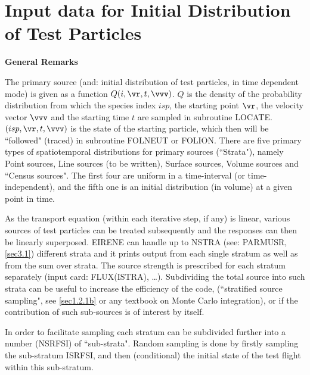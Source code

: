 \section{Input data for Initial Distribution of Test Particles}
\label{sec2.7}

\textbf{General Remarks} 

\medskip 

The primary source (and: initial distribution of test particles, in time
dependent mode) is given as a function $Q(i, \vr,t , \vvv)$.
$ Q $ is the density of the probability distribution from which the species
index $ isp $, the starting point $\vr $, the velocity vector $\vvv $ and the
starting time $ t $ are sampled in subroutine LOCATE.
$(isp, \vr,t, \vvv)$ is the state of the starting particle, which then will be
``followed" (traced) in subroutine FOLNEUT or FOLION.
There are five primary types of spatiotemporal distributions for primary
sources (``Strata"), namely Point sources, Line sources (to be written),
Surface sources, Volume sources and ``Census sources".
The first four are uniform in a time-interval (or time-independent), and the
fifth one is an initial distribution (in volume) at a given point in time.

As the transport equation (within each iterative step, if any) is linear,
various sources of test particles can be treated subsequently and the responses
can then be linearly superposed.
EIRENE can handle up to NSTRA (see: PARMUSR, \cref{sec3.1}) different strata
and it prints output from each single stratum as well as from the sum over
strata.
The source strength is prescribed for each stratum separately (input card:
FLUX(ISTRA), \dots).
Subdividing the total source into such strata can be useful to increase the
efficiency of the code, (``stratified source sampling", see \cref{sec1.2.1b} or
any textbook on Monte Carlo integration), or if the contribution of such
sub-sources is of interest by itself.

In order to facilitate sampling each stratum can be subdivided further into a
number (NSRFSI) of ``sub-strata".
Random sampling is done by firstly sampling the sub-stratum ISRFSI, and then
(conditional) the initial state of the test flight within this sub-stratum.

